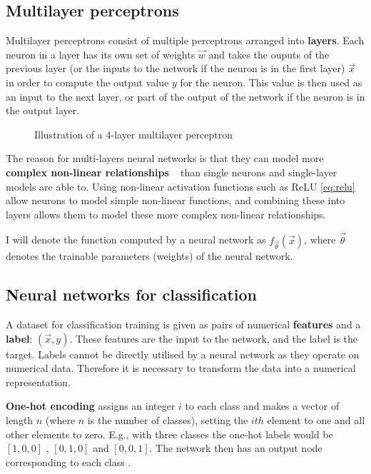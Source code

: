 \subsection{Multilayer perceptrons}

Multilayer perceptrons consist of multiple perceptrons arranged into \textbf{layers}. 
Each neuron in a layer has its own set of weights
$\vec{w}$ and takes the ouputs of the previous layer (or the inputs to the network if the neuron is in the first layer) $\vec{x}$ in order to compute the 
output value $y$ for the neuron. This value is then used as an input to the next layer, or part of the output of the network if the neuron is in
the output layer.
\begin{figure}[H]
  \begin{center}
      \scalebox{.65}{}
      \caption{Illustration of a 4-layer multilayer perceptron}
      \label{fig:illustration_deep_network}
  \end{center}
\end{figure}
 
The reason for multi-layers neural networks is that they can model more \textbf{complex non-linear relationships}
~\cite{Goodfellow-et-al-2016} than single 
neurons and single-layer models are able to. Using non-linear activation functions such as ReLU \eqref{eq:relu} allow neurons to model simple 
non-linear functions, and combining these into layers allows them to model these more complex non-linear relationships.

I will denote the function computed by a neural network as $f_{\vec{\theta}}(\vec{x})$, where $\vec{\theta}$ denotes the trainable parameters 
(weights) of the neural network.

\subsection{Neural networks for classification}

A dataset for classification training is given as pairs of numerical \textbf{features} and a \textbf{label}: $(\vec{x}, y)$. These features are 
the input to the network,
and the label is the target. Labels cannot be directly utilised by a neural network as they operate on numerical data. Therefore it is 
necessary to transform the data into a numerical representation.

\textbf{One-hot encoding} assigns an integer $i$ to each class and makes a vector of length $n$ (where $n$ is the 
number of classes), setting the $ith$ element to one and all other elements to zero. E.g., with three classes
the one-hot labels would be $[1, 0, 0]$ , $[0, 1, 0]$ and $[0, 0, 1]$. The network then has an output node corresponding to each class 
\cite{WhyOneHo55:online}.

